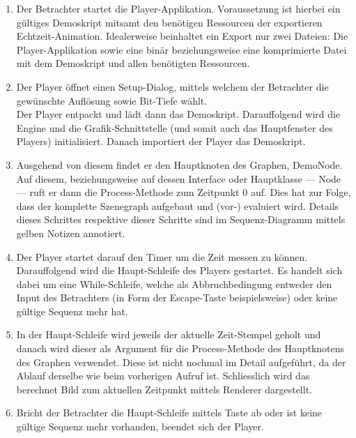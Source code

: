 \begin{enumerate}
    \item{%
            Der Betrachter startet die Player-Applikation. Voraussetzung ist hierbei ein
            gültiges Demoskript mitsamt den benötigen Ressourcen der exportieren
            Echtzeit-Animation. Idealerweise beinhaltet ein Export nur zwei Dateien: Die
            Player-Applikation sowie eine binär beziehungsweise eine komprimierte Datei mit
            dem Demoskript und allen benötigten Ressourcen.
        }

    \item{%
            Der Player öffnet einen Setup-Dialog, mittels welchem der Betrachter die
            gewünschte Auflösung sowie Bit-Tiefe wählt.\\
            Der Player entpackt und lädt dann das Demoskript. Darauffolgend wird die Engine
            und die Grafik-Schnittstelle (und somit auch das Hauptfenster des Players)
            initialisiert. Danach importiert der Player das Demoskript.
        }

    \item{%
            Ausgehend von diesem findet er den Hauptknoten des Graphen, DemoNode. Auf
            diesem, beziehungsweise auf dessen Interface oder Hauptklasse --- Node --- ruft
            er dann die Process-Methode zum Zeitpunkt 0 auf. Dies hat zur Folge, dass der
            komplette Szenegraph aufgebaut und (vor-) evaluiert wird. Details dieses
            Schrittes respektive dieser Schritte sind im Sequenz-Diagramm mittels gelben
            Notizen annotiert.
        }

    \item{%
            Der Player startet darauf den Timer um die Zeit messen zu können. Darauffolgend
            wird die Haupt-Schleife des Players gestartet. Es handelt sich dabei um eine
            While-Schleife, welche als Abbruchbedingung entweder den Input des Betrachters
            (in Form der Escape-Taste beispielsweise) oder keine gültige Sequenz mehr hat.
        }

    \item{%
            In der Haupt-Schleife wird jeweils der aktuelle Zeit-Stempel geholt und danach
            wird di\textsc{}eser als Argument für die Process-Methode des Hauptknotens des Graphen
            verwendet. Diese ist nicht nochmal im Detail aufgeführt, da der Ablauf derselbe
            wie beim vorherigen Aufruf ist. Schliesslich wird das berechnet Bild zum
            aktuellen Zeitpunkt mittels Renderer dargestellt.
        }

    \item{%
            Bricht der Betrachter die Haupt-Schleife mittels Taste ab oder ist keine
            gültige Sequenz mehr vorhanden, beendet sich der Player.
        }
\end{enumerate}

